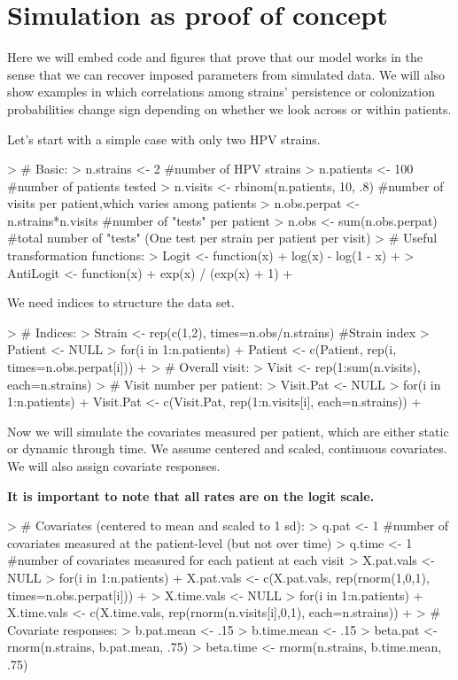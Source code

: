 \documentclass{article}
\begin{document}
\section*{Simulation as proof of concept}

Here we will embed code and figures that prove that our model works in the sense that we can recover imposed parameters from simulated data. We will also show examples in which correlations among strains' persistence or colonization probabilities change sign depending on whether we look across or within patients. 

Let's start with a simple case with only two HPV strains.
\begin{Schunk}
\begin{Sinput}
> # Basic:
> n.strains <- 2 #number of HPV strains
> n.patients <- 100 #number of patients tested
> n.visits <- rbinom(n.patients, 10, .8) #number of visits per patient,which varies among patients
> n.obs.perpat <- n.strains*n.visits #number of "tests" per patient
> n.obs <- sum(n.obs.perpat) #total number of "tests" (One test per strain per patient per visit)
> # Useful transformation functions:
> Logit <- function(x){
+   log(x) - log(1 - x)
+ }
> AntiLogit <- function(x){
+   exp(x) / (exp(x) + 1)
+ }
\end{Sinput}
\end{Schunk}

We need indices to structure the data set.
\begin{Schunk}
\begin{Sinput}
> # Indices:
> Strain <- rep(c(1,2), times=n.obs/n.strains) #Strain index
> Patient <- NULL
> for(i in 1:n.patients){
+   Patient <- c(Patient, rep(i, times=n.obs.perpat[i]))
+ }
> # Overall visit:
> Visit <- rep(1:sum(n.visits), each=n.strains) 
> # Visit number per patient:
> Visit.Pat <- NULL
> for(i in 1:n.patients){
+   Visit.Pat <- c(Visit.Pat, rep(1:n.visits[i], each=n.strains))
+ }
\end{Sinput}
\end{Schunk}

Now we will simulate the covariates measured per patient, which are either static or dynamic through time. We assume centered and scaled, continuous covariates. We will also assign covariate responses.

\textbf{It is important to note that all rates are on the logit scale.}
\begin{Schunk}
\begin{Sinput}
> # Covariates (centered to mean and scaled to 1 sd):
> q.pat <- 1 #number of covariates measured at the patient-level (but not over time)
> q.time <- 1 #number of covariates measured for each patient at each visit
> X.pat.vals <- NULL
> for(i in 1:n.patients){
+   X.pat.vals <- c(X.pat.vals, rep(rnorm(1,0,1), times=n.obs.perpat[i]))
+ }
> X.time.vals <- NULL
> for(i in 1:n.patients){
+   X.time.vals <- c(X.time.vals, rep(rnorm(n.visits[i],0,1), each=n.strains))
+ }
> # Covariate responses:
> b.pat.mean <- .15
> b.time.mean <- .15
> beta.pat <- rnorm(n.strains, b.pat.mean, .75)
> beta.time <- rnorm(n.strains, b.time.mean, .75)
\end{Sinput}
\end{Schunk}
\end{document}

